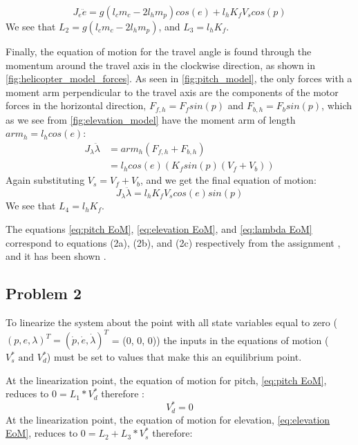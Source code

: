\begin{equation}
\label{eq:elevation EoM}
  J_e\ddot{e} = g(l_cm_c - 2l_hm_p)cos(e) + l_hK_fV_scos(p)
\end{equation}
We see that $L_2 = g(l_cm_c-2l_hm_p)$, and $L_3 = l_hK_f$.

Finally, the equation of motion for the travel angle is found through
the momentum around the travel axis in the  clockwise direction, as shown in \cref{fig:helicopter_model_forces}. As seen in \cref{fig:pitch_model}, the only forces with a moment arm
perpendicular to the travel axis are the components of the motor
forces in the horizontal direction, $F_{f,h} = F_fsin(p)$ and $F_{b,h} = F_bsin(p)$, which as we see from \cref{fig:elevation_model} have the moment arm of length $arm_h =
l_hcos(e)$:
\begin{align*}
  J_\lambda\ddot{\lambda} &= arm_h(F_{f,h} + F_{b,h}) \\
													&= l_hcos(e)(K_fsin(p)(V_f + V_b))
\end{align*}
Again substituting $V_s = V_f + V_b$, and we get the final equation of motion:
\begin{equation}
\label{eq:lambda EoM}
J_\lambda\ddot{\lambda} = l_hK_fV_scos(e)sin(p)
\end{equation}
We see that $L_4 = l_hK_f$.


The equations \cref{eq:pitch EoM}, \cref{eq:elevation EoM}, and \cref{eq:lambda EoM} correspond to equations (2a), (2b), and (2c) respectively from the assignment \cite[p.13]{assignment}, and it has been shown .

\subsection{Problem 2}
To linearize the system about the point with all state variables equal
to zero ($(p, e, \lambda)^T = (\dot{p},\dot{e},\dot{\lambda})^T $ = (0, 0, 0))
the inputs in the equations of motion ($V^{*}_{s} \text{ and } V^{*}_{d}$) must be set to
values that make this an equilibrium point.

At the linearization point, the equation of motion for pitch,
\cref{eq:pitch EoM}, reduces to $0 = L_{1} *
V^{*}_{d}$ therefore
:
\begin{equation}
\label{eq:V^*_d value}
  V^{*}_{d} = 0
\end{equation}
At the linearization point, the equation of motion for elevation,
\cref{eq:elevation EoM}, reduces to $0 = L_{2} +
L_{3}*V^{*}_{s}$ therefore:

